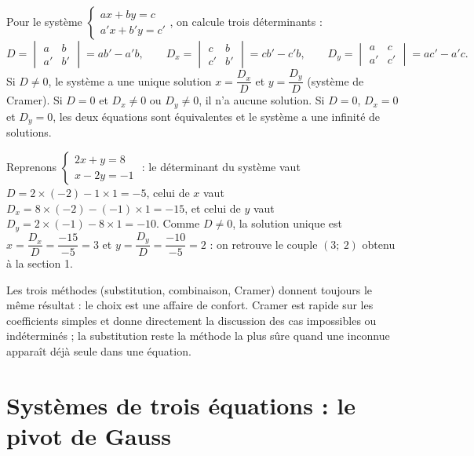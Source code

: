 \begin{propriete}
Pour le système $\begin{cases}ax + by = c\\ a'x + b'y = c'\end{cases}$, on calcule trois déterminants :
\[
D = \begin{vmatrix} a & b \\ a' & b' \end{vmatrix} = ab' - a'b, \qquad
D_{x} = \begin{vmatrix} c & b \\ c' & b' \end{vmatrix} = cb' - c'b, \qquad
D_{y} = \begin{vmatrix} a & c \\ a' & c' \end{vmatrix} = ac' - a'c .
\]
Si $D \neq 0$, le système a une unique solution $x = \dfrac{D_{x}}{D}$ et $y = \dfrac{D_{y}}{D}$ (système de Cramer). Si $D = 0$ et $D_{x} \neq 0$ ou $D_{y} \neq 0$, il n'a aucune solution. Si $D = 0$, $D_{x} = 0$ et $D_{y} = 0$, les deux équations sont équivalentes et le système a une infinité de solutions.
\end{propriete}

\begin{exemple}
Reprenons $\begin{cases}2x + y = 8\\ x - 2y = -1\end{cases}$ : le déterminant du système vaut $D = 2 \times (-2) - 1 \times 1 = -5$, celui de $x$ vaut $D_{x} = 8 \times (-2) - (-1) \times 1 = -15$, et celui de $y$ vaut $D_{y} = 2 \times (-1) - 8 \times 1 = -10$. Comme $D \neq 0$, la solution unique est $x = \dfrac{D_{x}}{D} = \dfrac{-15}{-5} = 3$ et $y = \dfrac{D_{y}}{D} = \dfrac{-10}{-5} = 2$ : on retrouve le couple $(3;\ 2)$ obtenu à la section 1.
\end{exemple}

\begin{remarque}
Les trois méthodes (substitution, combinaison, Cramer) donnent toujours le même résultat : le choix est une affaire de confort. Cramer est rapide sur les coefficients simples et donne directement la discussion des cas impossibles ou indéterminés ; la substitution reste la méthode la plus sûre quand une inconnue apparaît déjà seule dans une équation.
\end{remarque}

\section{Systèmes de trois équations : le pivot de Gauss}

